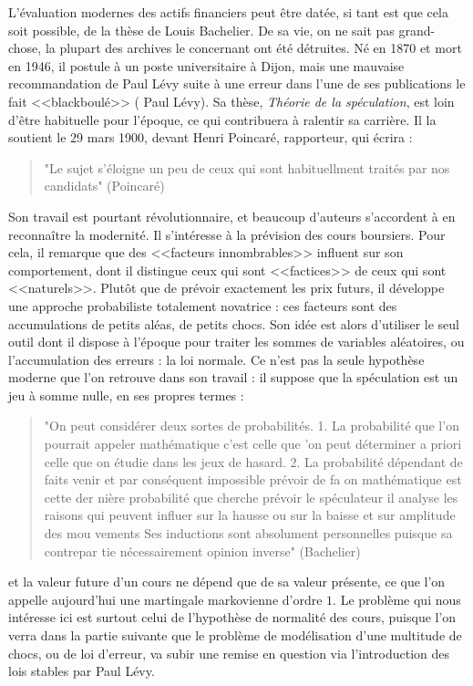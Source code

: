 \documentclass{article}
\begin{document}
L'évaluation modernes des actifs financiers peut être datée, si tant est que cela soit possible, de la thèse de Louis Bachelier. De sa vie, on ne sait pas grand-chose, la plupart des archives le concernant ont été détruites. Né en 1870 et mort en 1946, il postule à un poste universitaire à Dijon, mais une mauvaise recommandation de Paul Lévy suite à une erreur dans l'une de ses publications le fait <<blackboulé>> ( Paul Lévy). Sa thèse, \textit{Théorie de la spéculation}, est loin d'être habituelle pour l'époque, ce qui contribuera à ralentir sa carrière. Il la soutient le 29 mars 1900, devant Henri Poincaré, rapporteur, qui écrira :
\begin{quotation}"Le sujet s'éloigne un peu de ceux qui sont habituellment traités par nos candidats" (Poincaré)\end{quotation}
Son travail est pourtant révolutionnaire, et beaucoup d'auteurs s'accordent à en reconnaître la modernité. Il s'intéresse à la prévision des cours boursiers. Pour cela, il remarque que des <<facteurs innombrables>> influent sur son comportement, dont il distingue ceux qui sont <<factices>> de ceux qui sont <<naturels>>. Plutôt que de prévoir exactement les prix futurs, il développe une approche probabiliste totalement novatrice : ces facteurs sont des accumulations de petits aléas, de petits chocs. Son idée est alors d'utiliser le seul outil dont il dispose à l'époque pour traiter les sommes de variables aléatoires, ou l'accumulation des erreurs : la loi normale. Ce n'est pas la seule hypothèse moderne que l'on retrouve dans son travail : il suppose que la spéculation est un jeu à somme nulle, en ses propres termes : 

\begin{quotation}
"On peut considérer deux sortes de probabilités. 1. La probabilité que l'on pourrait appeler mathématique
c'est celle que 'on peut déterminer a priori celle que on étudie dans les
jeux de hasard. 2. La probabilité dépendant de faits venir et par
conséquent impossible prévoir de fa on mathématique est cette der
nière probabilité que cherche prévoir le spéculateur il analyse les raisons
qui peuvent influer sur la hausse ou sur la baisse et sur amplitude des mou
vements Ses inductions sont absolument personnelles puisque sa contrepar
tie nécessairement opinion inverse" (Bachelier)
\end{quotation}
et la valeur future d'un cours ne dépend que de sa valeur présente, ce que l'on appelle aujourd'hui une martingale markovienne d'ordre $1$. Le problème qui nous intéresse ici est surtout celui de l'hypothèse de normalité des cours, puisque l'on verra dans la partie suivante que le problème de modélisation d'une multitude de chocs, ou de loi d'erreur, va subir une remise en question via l'introduction des lois stables par Paul Lévy.\\
 
\end{document}
